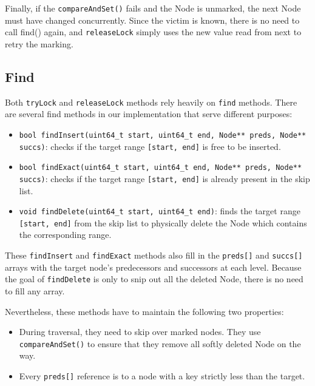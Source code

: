Finally, if the \texttt{compareAndSet()} fails and the Node is unmarked, the next Node must have changed concurrently. 
Since the victim is known, there is no need to call find() again, and \texttt{releaseLock} simply uses the new value read from next to retry the marking.

\subsection{Find}\label{subsec:find}

Both \texttt{tryLock} and \texttt{releaseLock} methods rely heavily on \texttt{find} methods.
There are several find methods in our implementation that serve different purposes:

\begin{itemize}
    \item \texttt{bool findInsert(uint64\_t start, uint64\_t end, Node** preds, Node** succs)}: checks if the target range \texttt{[start, end]} is free to be inserted.
    
    \item \texttt{bool findExact(uint64\_t start, uint64\_t end, Node** preds, Node** succs)}: checks if the target range \texttt{[start, end]} is already present in the skip list.
    
    \item \texttt{void findDelete(uint64\_t start, uint64\_t end)}: finds the target range \texttt{[start, end]} from the skip list to physically delete the Node which contains the corresponding range.
\end{itemize}

These \texttt{findInsert} and \texttt{findExact} methods also fill in the \texttt{preds[]} and \texttt{succs[]} arrays with the target node's predecessors and successors at each level.
Because the goal of \texttt{findDelete} is only to snip out all the deleted Node, there is no need to fill any array.

Nevertheless, these methods have to maintain the following two properties:

\begin{itemize}
    \item During traversal, they need to skip over marked nodes.
    They use \texttt{compareAndSet()} to ensure that they remove all softly deleted Node on the way.
    \item Every \texttt{preds[]} reference is to a node with a key strictly less than the target.
\end{itemize}


